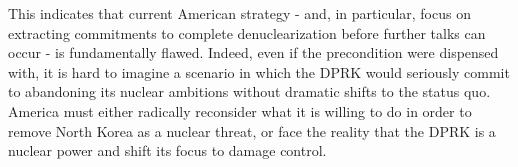 \documentclass{article}
\begin{document}

This indicates that current American strategy - and, in particular, focus on extracting commitments to complete denuclearization before further talks can occur - is fundamentally flawed. Indeed, even if the precondition were dispensed with, it is hard to imagine a scenario in which the DPRK would seriously commit to abandoning its nuclear ambitions without dramatic shifts to the status quo. America must either radically reconsider what it is willing to do in order to remove North Korea as a nuclear threat, or face the reality that the DPRK is a nuclear power and shift its focus to damage control.





\todos
\end{document}
